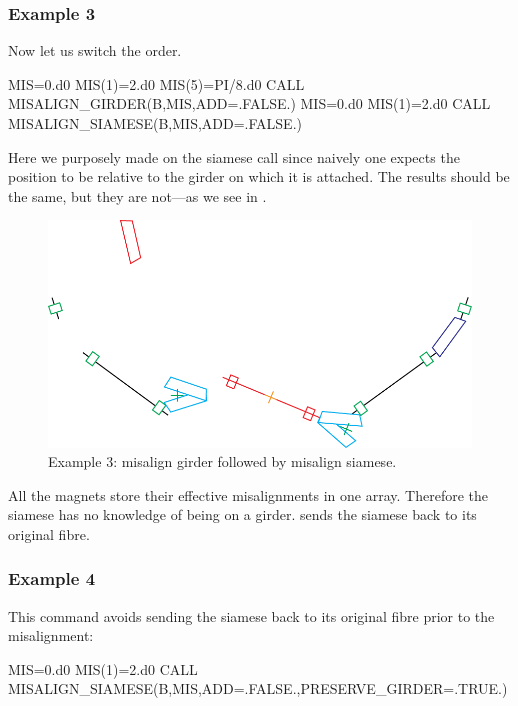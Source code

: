 \subsubsection*{Example 3}

Now let us switch the order.

\begin{ptccode}
MIS=0.d0
MIS(1)=2.d0
MIS(5)=PI/8.d0
CALL MISALIGN_GIRDER(B,MIS,ADD=.FALSE.)
MIS=0.d0
MIS(1)=2.d0
CALL MISALIGN_SIAMESE(B,MIS,ADD=.FALSE.)
\end{ptccode}

Here we purposely made  on the siamese call since
naively one expects the position to be relative to the girder on which it
is attached. The results should be the same, but they are not---as we see
in .

\begin{figure}[ht]
  \centering
  \includegraphics[width=.9\textwidth]{illustrations/misalign-fig5}
  \caption{Example 3: misalign girder followed by misalign siamese.}
  \label{fig:Example-3}
\end{figure}

All the magnets store their effective misalignments in one array.
Therefore the siamese has no knowledge of being on a girder.
  sends the siamese back to its original fibre.


\subsubsection*{Example 4}

This command avoids sending the siamese back to its original fibre 
prior to the misalignment:

\begin{ptccode}
MIS=0.d0
MIS(1)=2.d0
CALL MISALIGN_SIAMESE(B,MIS,ADD=.FALSE.,PRESERVE_GIRDER=.TRUE.)
\end{ptccode}

